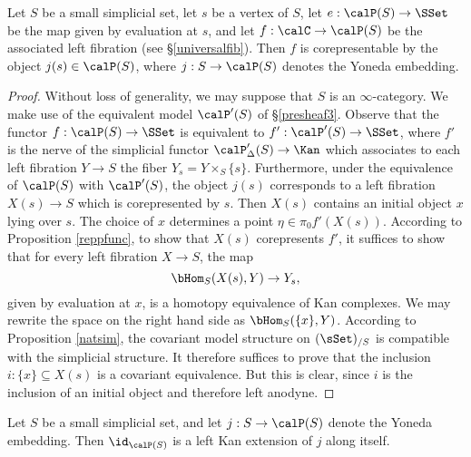 \begin{lemma}\label{repco}
Let $S$ be a small simplicial set, let $s$ be a vertex of $S$, let
$e: \calP(S) \rightarrow \SSet$ be the map given by evaluation at $s$, and let
$f: \calC \rightarrow \calP(S)$ be the associated left fibration (see \S \ref{universalfib}). Then
$f$ is corepresentable by the object $j(s) \in \calP(S)$, where $j: S \rightarrow \calP(S)$ denotes the Yoneda embedding.
\end{lemma}

\begin{proof}
Without loss of generality, we may suppose that $S$ is an $\infty$-category.
We make use of the equivalent model $\calP'(S)$ of \S \ref{presheaf3}. Observe that the functor
$f: \calP(S) \rightarrow \SSet$ is equivalent to $f': \calP'(S) \rightarrow \SSet$, where
$f'$ is the nerve of the simplicial functor $\calP'_{\Delta}(S) \rightarrow \Kan$ which
associates to each left fibration $Y \rightarrow S$ the fiber $Y_{s} = Y \times_{S} \{s\}$. 
Furthermore, under the equivalence of $\calP(S)$ with $\calP'(S)$, the object $j(s)$
corresponds to a left fibration $X(s) \rightarrow S$ which is corepresented by $s$. Then
$X(s)$ contains an initial object $x$ lying over $s$. The choice of $x$ determines a point 
$\eta \in \pi_0 f'(X(s))$. According to Proposition \ref{reppfunc}, to show that $X(s)$ corepresents $f'$, it suffices to show that for every left fibration $X \rightarrow S$, the map
$$ \bHom_{S}( X(s), Y) \rightarrow Y_{s}, $$
given by evaluation at $x$, is a homotopy equivalence of Kan complexes. 
We may rewrite the space on the right hand side as $\bHom_{S}( \{x\}, Y)$. According
to Proposition \ref{natsim}, the covariant model structure on $(\sSet)_{/S}$ is compatible with the simplicial structure. It therefore suffices to prove that the inclusion $i: \{ x\} \subseteq X(s)$ is a
covariant equivalence. But this is clear, since $i$ is the inclusion of an initial object and therefore left anodyne.
\end{proof}

\begin{lemma}\label{longwait0}
Let $S$ be a small simplicial set, and let $j: S \rightarrow \calP(S)$ denote the Yoneda embedding. Then $\id_{\calP(S)}$ is a left Kan extension of $j$ along itself.
\end{lemma}

